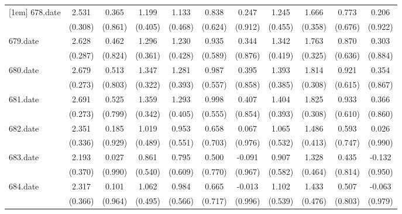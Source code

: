 \begin{tabular}{l*{10}{c}}
[1em]
678.date    &       2.531&       0.365&       1.199&       1.133&       0.838&       0.247&       1.245&       1.666&       0.773&       0.206\\
            &     (0.308)&     (0.861)&     (0.405)&     (0.468)&     (0.624)&     (0.912)&     (0.455)&     (0.358)&     (0.676)&     (0.922)\\
[1em]
679.date    &       2.628&       0.462&       1.296&       1.230&       0.935&       0.344&       1.342&       1.763&       0.870&       0.303\\
            &     (0.287)&     (0.824)&     (0.361)&     (0.428)&     (0.589)&     (0.876)&     (0.419)&     (0.325)&     (0.636)&     (0.884)\\
[1em]
680.date    &       2.679&       0.513&       1.347&       1.281&       0.987&       0.395&       1.393&       1.814&       0.921&       0.354\\
            &     (0.273)&     (0.803)&     (0.322)&     (0.393)&     (0.557)&     (0.858)&     (0.385)&     (0.308)&     (0.615)&     (0.867)\\
[1em]
681.date    &       2.691&       0.525&       1.359&       1.293&       0.998&       0.407&       1.404&       1.825&       0.933&       0.366\\
            &     (0.273)&     (0.799)&     (0.342)&     (0.405)&     (0.555)&     (0.854)&     (0.393)&     (0.308)&     (0.610)&     (0.860)\\
[1em]
682.date    &       2.351&       0.185&       1.019&       0.953&       0.658&       0.067&       1.065&       1.486&       0.593&       0.026\\
            &     (0.336)&     (0.929)&     (0.489)&     (0.551)&     (0.703)&     (0.976)&     (0.532)&     (0.413)&     (0.747)&     (0.990)\\
[1em]
683.date    &       2.193&       0.027&       0.861&       0.795&       0.500&      -0.091&       0.907&       1.328&       0.435&      -0.132\\
            &     (0.370)&     (0.990)&     (0.540)&     (0.609)&     (0.770)&     (0.967)&     (0.582)&     (0.464)&     (0.814)&     (0.950)\\
[1em]
684.date    &       2.317&       0.101&       1.062&       0.984&       0.665&      -0.013&       1.102&       1.433&       0.507&      -0.063\\
            &     (0.366)&     (0.964)&     (0.495)&     (0.566)&     (0.717)&     (0.996)&     (0.539)&     (0.476)&     (0.803)&     (0.979)\\

\end{tabular}
